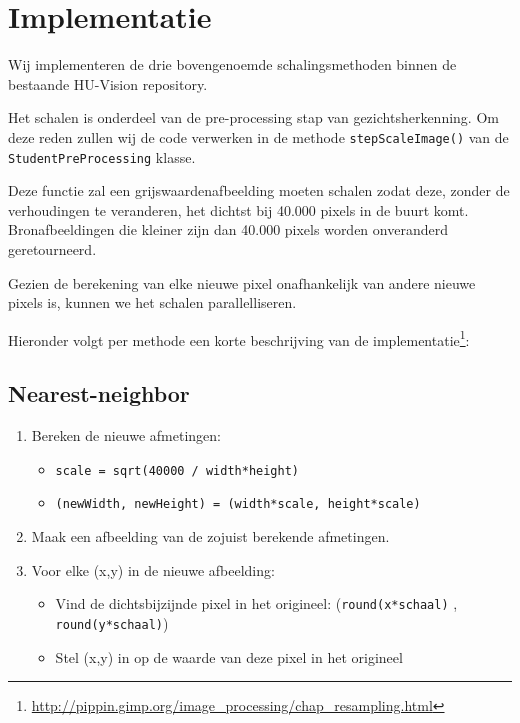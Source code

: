 \documentclass[a4paper]{article}
\begin{document}
\section{Implementatie}
\label{sec:orgfe48506}
Wij implementeren de drie bovengenoemde schalingsmethoden binnen de
bestaande HU-Vision repository.

Het schalen is onderdeel van de pre-processing stap van
gezichtsherkenning. Om deze reden zullen wij de code verwerken in de
methode \texttt{stepScaleImage()} van de \texttt{StudentPreProcessing} klasse.

Deze functie zal een grijswaardenafbeelding moeten schalen zodat deze,
zonder de verhoudingen te veranderen, het dichtst bij 40.000 pixels in
de buurt komt. Bronafbeeldingen die kleiner zijn dan 40.000 pixels
worden onveranderd geretourneerd.

Gezien de berekening van elke nieuwe pixel onafhankelijk van andere
nieuwe pixels is, kunnen we het schalen parallelliseren.

Hieronder volgt per methode een korte beschrijving van de
implementatie\footnote{\url{http://pippin.gimp.org/image\_processing/chap\_resampling.html}}:

\subsection{Nearest-neighbor}
\label{sec:orgba4310f}
\begin{enumerate}
\item Bereken de nieuwe afmetingen:
\begin{itemize}
\item \texttt{scale = sqrt(40000 / width*height)}
\item \texttt{(newWidth, newHeight) = (width*scale, height*scale)}
\end{itemize}
\item Maak een afbeelding van de zojuist berekende afmetingen.
\item Voor elke (x,y) in de nieuwe afbeelding:
\begin{itemize}
\item Vind de dichtsbijzijnde pixel in het origineel:
(\texttt{round(x*schaal)} , \texttt{round(y*schaal)})
\item Stel (x,y) in op de waarde van deze pixel in het origineel
\end{itemize}
\end{enumerate}
\end{document}
